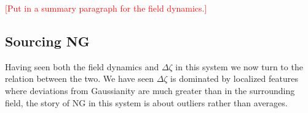 \textcolor{red}{[Put in a summary paragraph for the field dynamics.]}




\subsection{Sourcing NG} \label{sec:zeta production}




Having seen both the field dynamics and $\Delta\zeta$ in this system we now turn to the relation between the two.
We have seen $\Delta\zeta$ is dominated by localized features where deviations from Gaussianity are much greater than in the surrounding field, the story of NG in this system is about outliers rather than averages.


